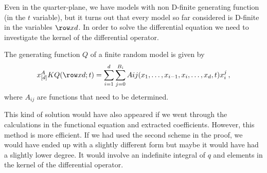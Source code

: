 Even in the quarter-plane, we have models with non D-finite generating function (in the $t$ variable), but it turns out that every model so far considered is D-finite in the variables $\row xd$. In order to solve the differential equation we need to investigate the kernel of the differential operator.
\begin{corollary}
The generating function $Q$ of a finite random model is given by
\begin{align}
	x_{[d]}^{A}KQ(\row xd;t) = \sum_{i=1}^d \sum_{j=0}^{B_i}Aij(x_1,\ldots,x_{i-1},x_i,\ldots, x_d,t) x_i^j\,,
\end{align}
where $A_{ij}$ are functions that need to be determined.
\end{corollary}
This kind of solution would have also appeared if we went through the calculations in the functional equation and extracted coefficients. However, this method is more efficient. If we had used the second scheme in the proof, we would have ended up with a slightly different form but maybe it would have had a slightly lower degree. It would involve an indefinite integral of $q$ and elements in the kernel of the differential operator.

